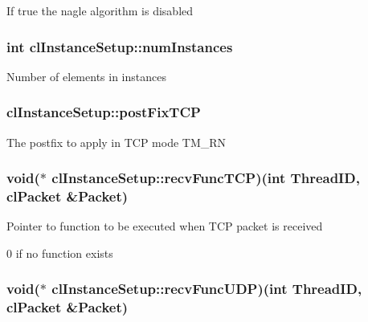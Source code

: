 \label{classcl_instance_setup_a0326fa43d0d08783d371c7aab79f6d75}
If true the nagle algorithm is disabled \hypertarget{classcl_instance_setup_a4163ffe3de7fb003f97e436491235b28}{
\subsubsection[{numInstances}]{\setlength{\rightskip}{0pt plus 5cm}int {\bf clInstanceSetup::numInstances}}}
\label{classcl_instance_setup_a4163ffe3de7fb003f97e436491235b28}
Number of elements in {\ttfamily instances} \hypertarget{classcl_instance_setup_a165b8b2dbed85b5b1ba3866cd9f06273}{
\subsubsection[{postFixTCP}]{ {\bf clInstanceSetup::postFixTCP}}}
\label{classcl_instance_setup_a165b8b2dbed85b5b1ba3866cd9f06273}
The postfix to apply in TCP mode {\ttfamily TM\_\-RN} \hypertarget{classcl_instance_setup_ad42bce75edecf44786bdc6bbbe46154b}{
\subsubsection[{recvFuncTCP}]{\setlength{\rightskip}{0pt plus 5cm}void($\ast$ {\bf clInstanceSetup::recvFuncTCP})(int ThreadID, {\bf clPacket} \&Packet)}}
\label{classcl_instance_setup_ad42bce75edecf44786bdc6bbbe46154b}
Pointer to function to be executed when TCP packet is received \par
 0 if no function exists \hypertarget{classcl_instance_setup_aef8ff6fa818c71994b82807842c583c6}{
\subsubsection[{recvFuncUDP}]{\setlength{\rightskip}{0pt plus 5cm}void($\ast$ {\bf clInstanceSetup::recvFuncUDP})(int ThreadID, {\bf clPacket} \&Packet)}}
